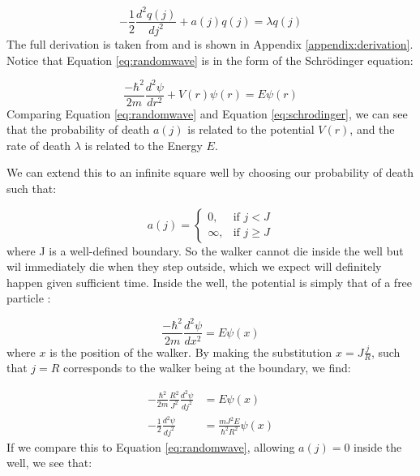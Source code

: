 \documentclass[journal]{IEEEtran}
\begin{document}
\begin{equation}
  -\frac{1}{2} \frac{d^2q(j)}{dj^2} + a(j)q(j) = \lambda q(j)
  \label{eq:randomwave}
\end{equation}
The full derivation is taken from \cite{MarcusNewton2020} and is shown in
Appendix \ref{appendix:derivation}. Notice that Equation \ref{eq:randomwave} is
in the form of the Schr\"{o}dinger equation:

\begin{equation}
  \label{eq:schrodinger}
  \frac{-\hbar^2}{2m}\frac{d^2 \psi}{dr^2} + V(r)\psi(r) = E\psi(r)
\end{equation}
Comparing Equation \ref{eq:randomwave} and Equation \ref{eq:schrodinger}, we can
see that the probability of death $a(j)$ is related to the potential $V(r)$,
and the rate of death $\lambda$ is related to the Energy $E$.

We can extend this to an infinite square well by choosing our probability of
death such that:

\begin{equation}
  \label{eq:squarewell}
    a(j) =
    \begin{cases}
      0,& \text{if } j < J\\
      \infty,& \text{if } j \geq J
    \end{cases}
    \nonumber
\end{equation}
where J is a well-defined boundary. So the walker cannot die inside the well but
wil immediately die when they step outside, which we expect will definitely
happen given sufficient time. Inside the well, the potential is simply that of a
free particle :

\begin{equation}
  \frac{-\hbar^2}{2m}\frac{d^2 \psi}{dx^2} = E\psi(x)
  \nonumber
\end{equation}
where $x$ is the position of the walker. By making the substitution
$x=J\frac{j}{R}$, such that $j=R$ corresponds to the walker being at the
boundary, we find:

\begin{equation}
  \begin{split}
    -\frac{\hbar^2}{2m}\frac{R^2}{J^2}\frac{d^2\psi}{dj^2} &= E\psi(x)\\
    -\frac{1}{2}\frac{d^2\psi}{dj^2} &= \frac{mJ^2E}{\hbar^2R^2}\psi(x)
  \end{split}
  \nonumber
\end{equation}
If we compare this to Equation \ref{eq:randomwave}, allowing $a(j) = 0$ inside
the well, we see that:
\end{document}
